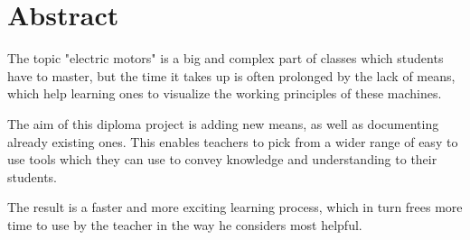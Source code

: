 \section*{Abstract}

The topic "electric motors" is a big and complex part of classes which students have to master, but the time it takes up is often prolonged by the lack of means, which help learning ones to visualize the working principles of these machines.

The aim of this diploma project is adding new means, as well as documenting already existing ones. This enables teachers to pick from a wider range of easy to use tools which they can use to convey knowledge and understanding to their students.

The result is a faster and more exciting learning process, which in turn frees more time to use by the teacher in the way he considers most helpful.
\newpage